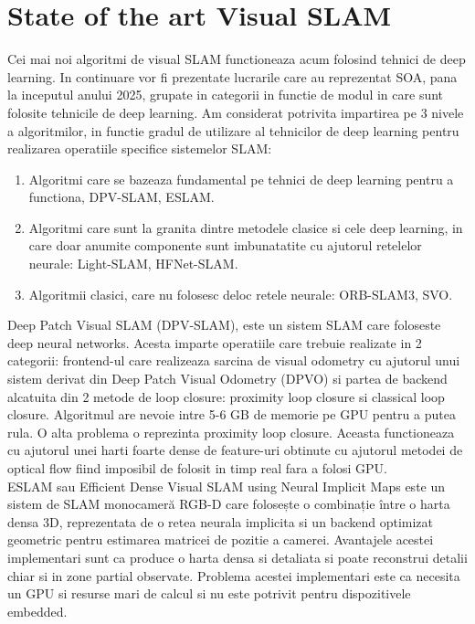 \documentclass[12pt,a4paper]{report}
\begin{document}
\section{State of the art Visual SLAM}
Cei mai noi algoritmi de visual SLAM functioneaza acum folosind tehnici
de deep learning. In continuare vor fi prezentate lucrarile care au reprezentat SOA, pana la inceputul 
anului 2025, grupate in categorii in functie de modul in care sunt folosite tehnicile de deep learning.
Am considerat potrivita impartirea pe 3 nivele a algoritmilor, in functie gradul de utilizare 
al tehnicilor de deep learning pentru realizarea operatiile specifice sistemelor SLAM:\@
\begin{enumerate}
    \item Algoritmi care se bazeaza fundamental pe tehnici de deep learning pentru a functiona, 
DPV-SLAM\cite{lipson2024deep}, ESLAM\cite{Wei2024RealTimeDV}.\@
    \item Algoritmi care sunt la granita dintre metodele clasice si cele deep learning, in care 
doar anumite componente sunt imbunatatite cu ajutorul retelelor neurale: Light-SLAM\cite{Zhao2024LightSLAMAR}, HFNet-SLAM\cite{Liu2023HFNetSLAMAA}.\@
    \item Algoritmii clasici, care nu folosesc deloc retele neurale: ORB-SLAM3\cite{9440682}, SVO\cite{Forster2014SVOFS}.\@ 
\end{enumerate}   
Deep Patch Visual SLAM (DPV-SLAM), este un sistem SLAM care foloseste deep neural networks.
Acesta imparte operatiile care trebuie realizate in 2 categorii: frontend-ul care realizeaza 
sarcina de visual odometry cu ajutorul unui sistem derivat din Deep Patch Visual Odometry (DPVO)\cite{Teed2022DeepPV}
si partea de backend alcatuita din 2 metode de loop closure: proximity loop closure si classical
loop closure. Algoritmul are nevoie intre 5{-}6 GB de memorie pe GPU pentru a putea rula. 
O alta problema o reprezinta proximity loop closure. Aceasta functioneaza cu ajutorul unei harti
foarte dense de feature-uri obtinute cu ajutorul metodei de optical flow fiind imposibil de folosit 
in timp real fara a folosi GPU.\@ \\

ESLAM sau Efficient Dense Visual SLAM using Neural Implicit Maps este un sistem de SLAM 
monocameră RGB-D care folosește o combinație între o harta densa 3D, reprezentata de o retea 
neurala implicita si un backend optimizat geometric pentru estimarea matricei de pozitie a camerei.
Avantajele acestei implementari sunt ca produce o harta densa si detaliata si poate reconstrui 
detalii chiar si in zone partial observate. Problema acestei implementari este ca necesita un 
GPU si resurse mari de calcul si nu este potrivit pentru dispozitivele embedded. \\
\end{document}
